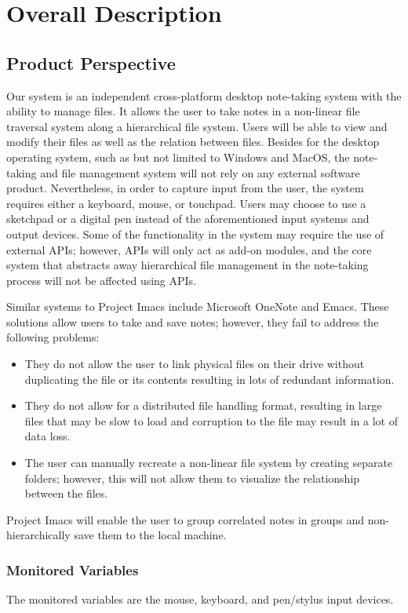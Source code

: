 \documentclass{article}
\begin{document}
\section{Overall Description}
\subsection{Product Perspective}
Our system is an independent cross-platform desktop note-taking system with the ability to manage files. It allows the user to take notes in a non-linear file traversal system along a hierarchical file system. Users will be able to view and modify their files as well as the relation between files. Besides for the desktop operating system, such as but not limited to Windows and MacOS, the note-taking and file management system will not rely on any external software product. Nevertheless, in order to capture input from the user, the system requires either a keyboard, mouse, or touchpad. Users may choose to use a sketchpad or a digital pen instead of the aforementioned input systems and output devices. Some of the functionality in the system may require the use of external APIs; however, APIs will only act as add-on modules, and the core system that abstracts away hierarchical file management in the note-taking process will not be affected using APIs.

Similar systems to Project Imacs include Microsoft OneNote and Emacs. These solutions allow users to take and save notes; however, they fail to address the following problems:

\begin{itemize}
\item They do not allow the user to link physical files on their drive without duplicating the file or its contents resulting in lots of redundant information.
\item They do not allow for a distributed file handling format, resulting in large files that may be slow to load and corruption to the file may result in a lot of data loss.
\item The user can manually recreate a non-linear file system by creating separate folders; however, this will not allow them to visualize the relationship between the files.
\end{itemize}

Project Imacs will enable the user to group correlated notes in groups and non-hierarchically save them to the local machine.

\subsubsection{Monitored Variables}
The monitored variables are the mouse, keyboard, and pen/stylus input devices.
\end{document}
